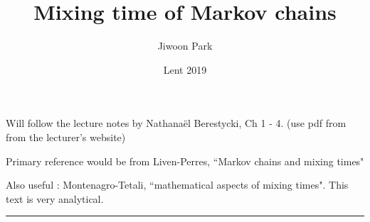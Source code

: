 \documentclass[12pt,a4paper]{article}
\DeclarePairedDelimiter\bignorm{\lVert}{\rVert}
\newcommand{\doublerule}[1][.4pt]{%
  \noindent
  \makebox[0pt][l]{\rule[.7ex]{\linewidth}{#1}}%
  \rule[.3ex]{\linewidth}{#1}}
\begin{document}
\title{Mixing time of Markov chains}
\author{Jiwoon Park}
\date{Lent 2019}

\maketitle

\newcommand{\thm}{\textbf{Theorem) }}
\newcommand{\thmnum}[1]{\textbf{Theorem #1) }}
\newcommand{\defi}{\textbf{Definition) }}
\newcommand{\definum}[1]{\textbf{Definition #1) }}
\newcommand{\lem}{\textbf{Lemma) }}
\newcommand{\lemnum}[1]{\textbf{Lemma #1) }}
\newcommand{\prop}{\textbf{Proposition) }}
\newcommand{\propnum}[1]{\textbf{Proposition #1) }}
\newcommand{\corr}{\textbf{Corollary) }}
\newcommand{\corrnum}[1]{\textbf{Corollary #1) }}
\newcommand{\pf}{\textbf{proof) }}

\newcommand{\lap}{\triangle} %
\newcommand{\s}{\vspace{10pt}}
\newcommand{\bull}{$\bullet$}
\newcommand{\sta}{$\star$}
\newcommand{\reals}{\mathbb{R}}

\newcommand{\eop}{\hfill  \textsl{(End of proof)} $\square$} %
\newcommand{\eos}{\hfill  \textsl{(End of statement)} $\square$} %


\newcommand{\intN}{\mathbb{Z}_N}
\newcommand{\nat}{\mathbb{N}}
\newcommand{\norms}[2]{\bignorm[\big]{#1}_{#2}}
\newcommand{\abs}[1]{\big| #1 \big|}
\newcommand{\avg}{\mathbb{E}}
\newcommand{\prob}{\mathbb{P}}
\newcommand{\borel}{\mathscr{B}}
\newcommand{\EE}{\mathscr{E}}
\newcommand{\pa}{\partial}
\newcommand{\loc}{L^1_{\text{loc}}}
\newcommand{\tmix}{\text{tmix}}

\renewcommand{\vec}{\underline}
\renewcommand{\bar}{\overline}


\def\doubleunderline#1{\underline{\underline{#1}}}

\newcommand{\newday}{\doublerule[0.5pt]}
\newcommand{\digression}{**********************************************************************************************}

\setlength\parindent{0pt}

Will follow the lecture notes by Nathana\"{e}l Berestycki, Ch 1 - 4. (use pdf from from the lecturer's website)

Primary reference would be from Liven-Perres, ``Markov chains and mixing times"

Also useful : Montenagro-Tetali, ``mathematical aspects of mixing times". This text is very analytical.
\s

\newday
\end{document}
